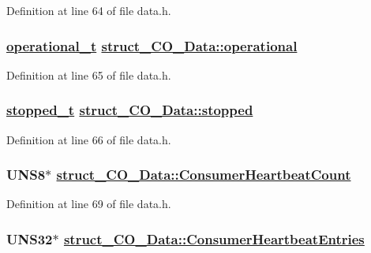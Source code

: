 Definition at line 64 of file data.h.\hypertarget{structstruct__CO__Data_432ddce132ec2f7473064e4fa8ef3f9a}{
\subsubsection[operational]{\setlength{\rightskip}{0pt plus 5cm}\hyperlink{states_8h_8aed99e590473f26db47a9c2dc5b73fc}{operational\_\-t} \hyperlink{structstruct__CO__Data_432ddce132ec2f7473064e4fa8ef3f9a}{struct\_\-CO\_\-Data::operational}}}
\label{structstruct__CO__Data_432ddce132ec2f7473064e4fa8ef3f9a}




Definition at line 65 of file data.h.\hypertarget{structstruct__CO__Data_89dd7dd17f9dd16b7a06c3cf30c2ca02}{
\subsubsection[stopped]{\setlength{\rightskip}{0pt plus 5cm}\hyperlink{states_8h_c99397ce6341b6b5128104aee4c27ec5}{stopped\_\-t} \hyperlink{structstruct__CO__Data_89dd7dd17f9dd16b7a06c3cf30c2ca02}{struct\_\-CO\_\-Data::stopped}}}
\label{structstruct__CO__Data_89dd7dd17f9dd16b7a06c3cf30c2ca02}




Definition at line 66 of file data.h.\hypertarget{structstruct__CO__Data_51a0927cdf730eca5661d2d1a26b9e43}{
\subsubsection[ConsumerHeartbeatCount]{\setlength{\rightskip}{0pt plus 5cm}UNS8$\ast$ \hyperlink{structstruct__CO__Data_51a0927cdf730eca5661d2d1a26b9e43}{struct\_\-CO\_\-Data::Consumer\-Heartbeat\-Count}}}
\label{structstruct__CO__Data_51a0927cdf730eca5661d2d1a26b9e43}




Definition at line 69 of file data.h.\hypertarget{structstruct__CO__Data_928052654c25135aab556909845fa8ea}{
\subsubsection[ConsumerHeartbeatEntries]{\setlength{\rightskip}{0pt plus 5cm}UNS32$\ast$ \hyperlink{structstruct__CO__Data_928052654c25135aab556909845fa8ea}{struct\_\-CO\_\-Data::Consumer\-Heartbeat\-Entries}}}
\label{structstruct__CO__Data_928052654c25135aab556909845fa8ea}




